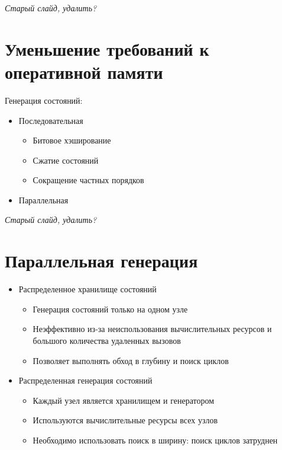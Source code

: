 \documentclass[12pt]{article}
\begin{document}
\textit{Старый слайд, удалить?}

\section{Уменьшение требований к оперативной памяти}
\label{sec:ram-lightening}

Генерация состояний:

\begin{itemize}
\item Последовательная
  \begin{itemize}
  \item Битовое хэширование
  \item Сжатие состояний
  \item Сокращение частных порядков
  \end{itemize}
\item Параллельная
\end{itemize}

\textit{Старый слайд, удалить?}

\section{Параллельная генерация}
\label{sec:par-gen}

\begin{itemize}
\item Распределенное хранилище состояний
  \begin{itemize}
  \item Генерация состояний только на одном узле
  \item Неэффективно из-за неиспользования вычислительных ресурсов и большого количества
    удаленных вызовов
  \item Позволяет выполнять обход в глубину и поиск циклов
  \end{itemize}

\item Распределенная генерация состояний
  \begin{itemize}
  \item Каждый узел является хранилищем и генератором
  \item Используются вычислительные ресурсы всех узлов
  \item Необходимо использовать поиск в ширину: поиск циклов затруднен
  \end{itemize}

\end{itemize}
\end{document}
